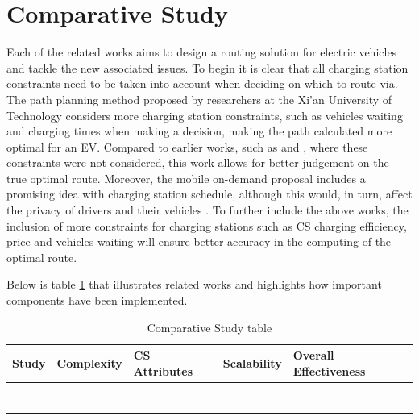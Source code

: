 \documentclass[11pt]{report}
\begin{document}
\section{Comparative Study}

Each of the related works aims to design a routing solution for electric vehicles and tackle the new associated issues. To begin it is clear that all charging station constraints need to be taken into account when deciding on which to route via. The path planning method proposed by researchers at the Xi’an University of Technology \autocite{sparkEVChargingDing} considers more charging station constraints, such as vehicles waiting and charging times when making a decision, making the path calculated more optimal for an EV. Compared to earlier works, such as \autocite{kobayashi2011route} and \autocite{bellmanFordRouting}, where these constraints were not considered, this work allows for better judgement on the true optimal route. Moreover, the mobile on-demand proposal includes a promising idea with charging station schedule, although this would, in turn, affect the privacy of drivers and their vehicles \autocite{inRouteOptimalAmmous}. To further include the above works, the inclusion of more constraints for charging stations such as CS charging efficiency, price and vehicles waiting will ensure better accuracy in the computing of the optimal route.

Below is table \ref{table:4} that illustrates related works and highlights how important components have been implemented.

\begin{table}[h!]
\begin{center}
\begin{tabular}{|p{3cm} p{2.8cm} p{2.8cm} p{3cm} p{3cm}|} 
 \hline
 \bf{Study} & Complexity & CS Attributes & Scalability & Overall Effectiveness \\
 \hline
 \bf{\autocite{kobayashi2011route}} &  &  &  & \\ 
 \bf{\autocite{bellmanFordRouting}} &  &  &  & \\
 \bf{\autocite{inRouteOptimalAmmous}} &  &  &  & \\
 \bf{\autocite{csNearestNeighbourDaanish}} &  &  &  & \\
 \bf{\autocite{distributedRoutingTang}} &  &  &  & \\
 \bf{\autocite{sparkEVChargingDing}} &  &  &  & \\
 \bf{\autocite{optimizationTabuSearch}} &  &  &  & \\
 \hline
\end{tabular}
\end{center}
\caption{Comparative Study table}
\label{table:4}
\end{table}
\end{document}
